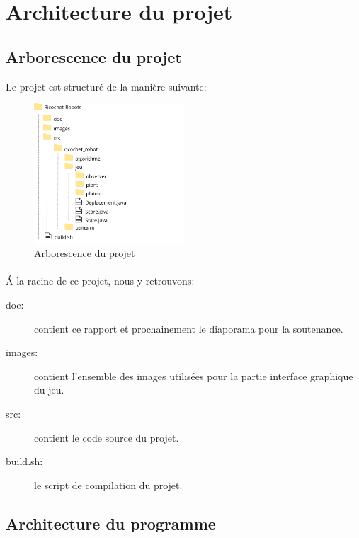 \documentclass[a4paper, 12pt]{article}
\begin{document}
\newpage %

\section{Architecture du projet}
    \subsection{Arborescence du projet}
    
        Le projet est structuré de la manière suivante:
        
        \begin{figure}[H]
    		\centering\includegraphics[width=0.5\textwidth]{images/structureprojet.png}
    		\caption{Arborescence du projet}
    	\end{figure}
    	
    	\paragraph{}
    	Á la racine de ce projet, nous y retrouvons:
    	
    	\begin{description}
    	    \item [doc:] contient ce rapport et prochainement le diaporama pour la soutenance.
    	    \item [images:] contient l'ensemble des images utilisées pour la partie interface graphique du jeu.
    	    \item [src:] contient le code source du projet.
    	    \item [build.sh:] le script de compilation du projet.
    	\end{description}
    	
    \subsection{Architecture du programme}
    
\end{document}
